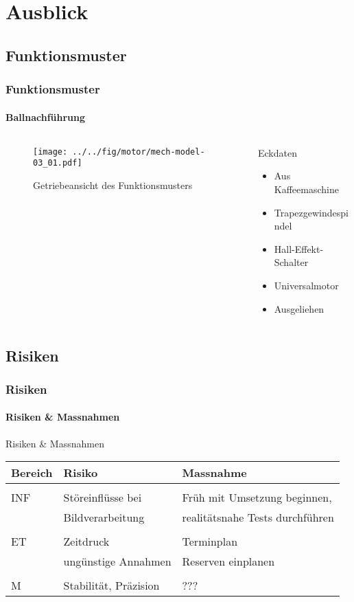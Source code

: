\section{Ausblick}

\subsection{Funktionsmuster}
\begin{frame}
	\frametitle{Funktionsmuster\hfill{}\footnotesize \group}
	\framesubtitle{Ballnachführung}
	\begin{columns}
		\begin{column}{0.5\textwidth}
			\begin{figure}
				\texttt{[image: ../../fig/motor/mech-model-03\_01.pdf]}
				\caption{Getriebeansicht des Funktionsmusters}
			\end{figure}
		\end{column}
		\begin{column}{0.5\textwidth}
			\begin{block}{Eckdaten}
				\begin{itemize}
					\item Aus Kaffeemaschine
					\item Trapezgewindespindel
					\item Hall-Effekt-Schalter
					\item Universalmotor
					\item Ausgeliehen
				\end{itemize}
			\end{block}
		\end{column}
	\end{columns}
\end{frame}

\subsection{Risiken}
\begin{frame}
	\frametitle{Risiken \hfill{} \footnotesize \group}
	\framesubtitle{Risiken \& Massnahmen}
	\begin{block}{Risiken \& Massnahmen}
		\begin{tabular}{l l l}
			Bereich
				& Risiko
				& Massnahme \\
			\hline
			& & \\
			INF	& Störeinflüsse bei 
				& Früh mit 
				  Umsetzung beginnen, \\
				& Bildverarbeitung
				& realitätsnahe Tests
				 durchführen \\
			& & \\
			ET	& Zeitdruck
				& Terminplan \\
				& ungünstige Annahmen
				& Reserven einplanen \\
			& & \\
			M	& Stabilität, Präzision
				& ??? \\
		\end{tabular}
	\end{block}
\end{frame}
